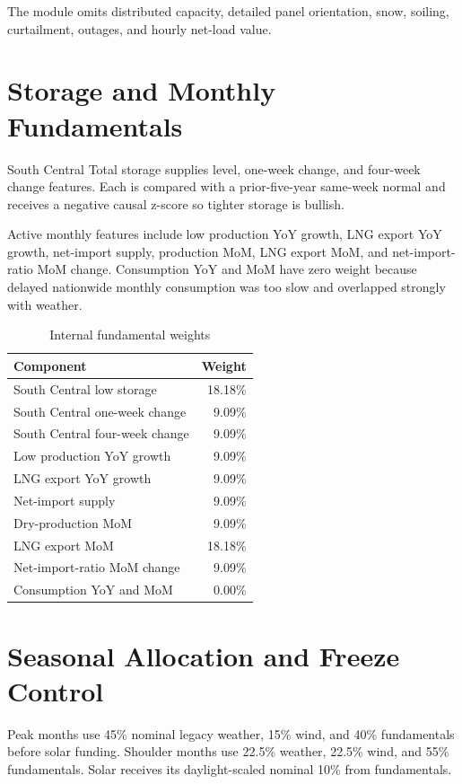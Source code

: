 \documentclass[11pt,a4paper]{article}
\begin{document}
The module omits distributed capacity, detailed panel orientation, snow,
soiling, curtailment, outages, and hourly net-load value.

\section{Storage and Monthly Fundamentals}

South Central Total storage supplies level, one-week change, and four-week
change features. Each is compared with a prior-five-year same-week normal and
receives a negative causal z-score so tighter storage is bullish.

Active monthly features include low production YoY growth, LNG export YoY
growth, net-import supply, production MoM, LNG export MoM, and net-import-ratio
MoM change. Consumption YoY and MoM have zero weight because delayed nationwide
monthly consumption was too slow and overlapped strongly with weather.

\begin{table}[h]
\centering
\caption{Internal fundamental weights}
\begin{tabular}{lr}
\toprule
Component & Weight\\
\midrule
South Central low storage & 18.18\%\\
South Central one-week change & 9.09\%\\
South Central four-week change & 9.09\%\\
Low production YoY growth & 9.09\%\\
LNG export YoY growth & 9.09\%\\
Net-import supply & 9.09\%\\
Dry-production MoM & 9.09\%\\
LNG export MoM & 18.18\%\\
Net-import-ratio MoM change & 9.09\%\\
Consumption YoY and MoM & 0.00\%\\
\bottomrule
\end{tabular}
\end{table}

\section{Seasonal Allocation and Freeze Control}

Peak months use 45\% nominal legacy weather, 15\% wind, and 40\% fundamentals
before solar funding. Shoulder months use 22.5\% weather, 22.5\% wind, and 55\%
fundamentals. Solar receives its daylight-scaled nominal 10\% from fundamentals.
\end{document}
